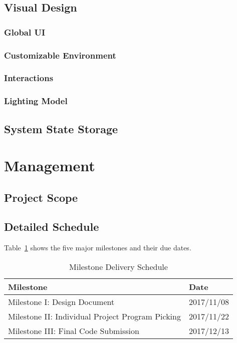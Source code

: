 \documentclass[titlepage,12pt]{article}
\begin{document}
\subsection{Visual Design}

\subsubsection{Global UI}\label{sec:ui}

\subsubsection{Customizable Environment}\label{sec:env}

\subsubsection{Interactions}

\subsubsection{Lighting Model}

\subsection{System State Storage}\label{sec:state}

\section{Management}

\subsection{Project Scope}

\subsection{Detailed Schedule}
Table~\ref{tab:milestones} shows the five major milestones and their due dates.
\begin{table}[H]
    \caption{Milestone Delivery Schedule}
    \label{tab:milestones}
    \centering
    \begin{tabular}{|l|l|}
        \hline
        \textbf{Milestone} & \textbf{Date} \\
        \hline\hline
        Milestone I: Design Document & 2017/11/08 \\
        \hline
        Milestone II: Individual Project Program Picking & 2017/11/22 \\
        \hline
        Milestone III: Final Code Submission & 2017/12/13 \\
        \hline
    \end{tabular}
\end{table}
\end{document}
